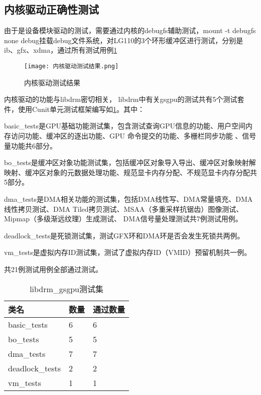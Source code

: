 \subsection{内核驱动正确性测试}
由于是设备模块驱动的测试，需要通过内核的debugfs辅助测试，mount -t debugfs none debug挂载debug文件系统，对LG110的3个环形缓冲区进行测试，分别是
ib、gfx、xdma，通过所有测试用例\ref{fig:内核驱动测试结果}

\begin{figure}[H]
    \centering
    \texttt{[image: 内核驱动测试结果.png]}
    \caption{内核驱动测试结果}
    \label{fig:内核驱动测试结果}
\end{figure}

内核驱动的功能与libdrm密切相关，
libdrm中有关gsgpu的测试共有5个测试套件，使用Cunit单元测试框架编写如\ref{tab:libdrm_gsgpu测试集}。其中：

basic\_tests是GPU基础功能测试集，包含测试查询GPU信息的功能、用户空间内存访问功能、缓冲区的逐出功能、GPU 命令提交的功能、多栅栏同步功能 、信号量功能共6部分。

bo\_tests是缓冲区对象功能测试集，包括缓冲区对象导入导出、缓冲区对象映射解映射、缓冲区对象的元数据处理功能、规范显卡内存分配、不规范显卡内存分配共5部分。

dma\_tests是DMA相关功能的测试集，包括DMA线性写、DMA常量填充、DMA线性拷贝测试、DMA Tiled拷贝测试、MSAA（多重采样抗锯齿）图像测试、Mipmap（多级渐远纹理）生成测试、
DMA信号量处理测试共7例测试用例。

deadlock\_tests是死锁测试集，测试GFX环和DMA环是否会发生死锁共两例。

vm\_tests是虚拟内存ID测试集，测试了虚拟内存ID（VMID）预留机制共一例。

共21例测试用例全部通过测试。

\begin{table}[H]
    \centering
    \caption{libdrm\_gsgpu测试集}
    \label{tab:libdrm_gsgpu测试集}
    \begin{tabular}{lll}
      \toprule
      类名   &  数量  &通过数量\\
      \midrule
      basic\_tests & 6 & 6\\
      bo\_tests & 5 & 5\\
      dma\_tests & 7 & 7\\
      deadlock\_tests & 2 &2\\
      vm\_tests & 1 &1\\
      \bottomrule
    \end{tabular}
    \note{}
\end{table}

